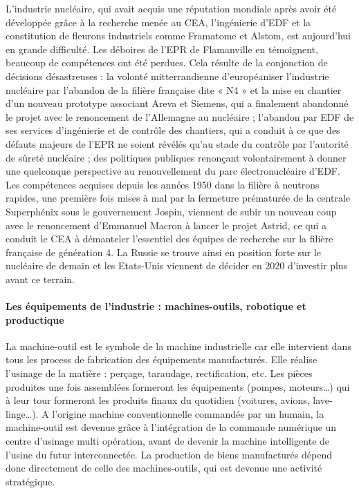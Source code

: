 \documentclass[a4paper]{article}
\begin{document}
L’industrie nucléaire, qui avait acquis une réputation mondiale après avoir été développée grâce à la recherche menée au CEA, l’ingénierie d’EDF et la constitution de fleurons industriels comme Framatome et Alstom, est aujourd’hui en grande difficulté. Les déboires de l’EPR de Flamanville en témoignent, beaucoup de compétences ont été perdues. Cela résulte de la conjonction de décisions désastreuses : la volonté mitterrandienne d’européaniser l’industrie nucléaire par l’abandon de la filière française dite « N4 » et la mise en chantier d’un nouveau prototype associant Areva et Siemens, qui a finalement abandonné le projet avec le renoncement de l’Allemagne au nucléaire ; l’abandon par EDF de ses services d’ingénierie et de contrôle des chantiers, qui a conduit à ce que des défauts majeurs de l’EPR ne soient révélés qu’au stade du contrôle par l’autorité de sûreté nucléaire ; des politiques publiques renonçant volontairement à donner une quelconque perspective au renouvellement du parc électronucléaire d’EDF. Les compétences acquises depuis les années 1950 dans la filière  à neutrons rapides, une première fois mises à mal par la fermeture prématurée de la centrale  Superphénix sous le gouvernement Jospin, viennent de subir un nouveau coup avec le renoncement d’Emmanuel Macron à lancer le projet Astrid, ce qui a conduit le CEA à démanteler l’essentiel des équipes de recherche sur la filière française de génération 4. La Russie se trouve ainsi en position forte sur le nucléaire de demain et les Etats-Unis viennent de décider en 2020 d’investir plus avant ce terrain. 

\paragraph{Les équipements de l’industrie : machines-outils, robotique et productique}
La machine-outil est le symbole de la machine industrielle car elle intervient dans tous les process de fabrication des équipements manufacturés. Elle réalise l’usinage de la matière : perçage, taraudage, rectification, etc. Les pièces produites une fois assemblées formeront les équipements (pompes, moteurs…) qui à leur tour formeront les produits finaux du quotidien (voitures, avions, lave-linge…). A l’origine machine conventionnelle commandée par un humain, la machine-outil est devenue grâce à l’intégration de la commande numérique un centre d’usinage multi opération, avant de devenir la machine intelligente de l'usine du futur interconnectée. La production de biens manufacturés dépend donc directement de celle des machines-outils, qui est devenue une activité stratégique.
\end{document}
